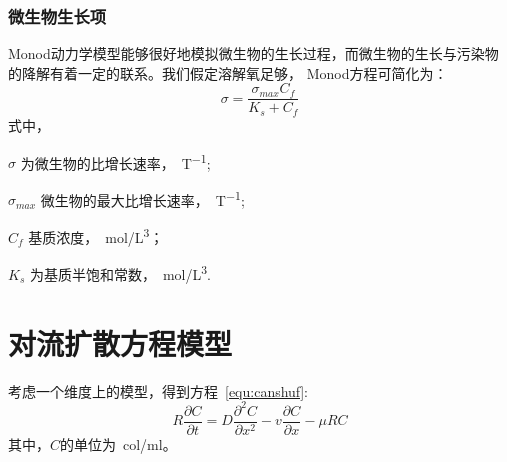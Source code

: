 \subsubsection{微生物生长项}
Monod动力学模型能够很好地模拟微生物的生长过程，而微生物的生长与污染物的降解有着一定的联系。我们假定溶解氧足够，
Monod方程可简化为：
\begin{equation}
\sigma = \dfrac{\sigma_{max}C_f}{K_s+C_f}
\end{equation}
式中，
\begin{paralist}
	\item[$\sigma$]为微生物的比增长速率，\SI{}{T^{-1}};
	\item[$\sigma_{max}$]微生物的最大比增长速率，\SI{}{T^{-1}};
	\item[$C_f$]基质浓度，\SI{}{mol/L^3}；
	\item[$K_s$]为基质半饱和常数，\SI{}{mol/L^3}.
\end{paralist}
\section{对流扩散方程模型}
考虑一个维度上的模型，得到方程~\eqref{equ:canshuf}:
\begin{equation}\label{equ:canshuf}
	R\dfrac{\partial C}{\partial t} = D\dfrac{\partial^2 C}{\partial x^2}-v\dfrac{\partial C}{\partial x}-\mu RC
\end{equation}
其中，$C$的单位为\SI{}{col/ml}。\par

